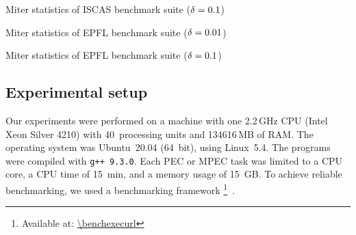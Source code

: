 \begin{table}[ht]
    \centering
    \scriptsize
    \caption{Miter statistics of ISCAS benchmark suite ($\delta=0.1$)}
    \label{tbl:prob-design-eval-miter-iscas-0.10}
\end{table}

\begin{table}[hp]
    \centering
    \scriptsize
    \caption{Miter statistics of EPFL benchmark suite ($\delta=0.01$)}
    \label{tbl:prob-design-eval-miter-epfl-0.01}
\end{table}

\begin{table}[hp]
    \centering
    \scriptsize
    \caption{Miter statistics of EPFL benchmark suite ($\delta=0.1$)}
    \label{tbl:prob-design-eval-miter-epfl-0.10}
\end{table}

\subsection{Experimental setup}
Our experiments were performed on a machine with
one 2.2\,GHz CPU (Intel Xeon Silver 4210) with 40~processing units and 134616\,MB of RAM.
The operating system was Ubuntu~20.04 (64~bit),
using Linux~5.4.
The programs were compiled with \texttt{g++ 9.3.0}.
Each PEC or MPEC task was limited to a CPU core,
a CPU time of \SI{15}{min},
and a memory usage of \SI{15}{GB}.
To achieve reliable benchmarking,
we used a benchmarking framework \benchexec\footnote{Available at: \url{\benchexecurl}}~\cite{Benchmarking-STTT}.

